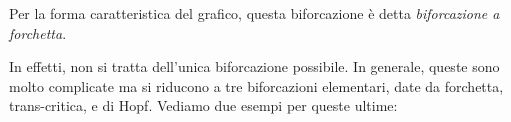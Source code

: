 \documentclass{report}
\begin{document}
\begin{example}
\begin{center}
    \end{center}

    Per la forma caratteristica del grafico, questa biforcazione è detta \emph{biforcazione a forchetta}. 
\end{example}

In effetti, non si tratta dell'unica biforcazione possibile. In generale, queste sono molto complicate ma si riducono a tre biforcazioni elementari, date da forchetta, trans-critica, e di Hopf. Vediamo due esempi per queste ultime: 
\end{document}
